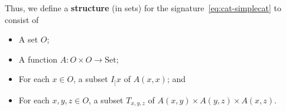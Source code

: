 \documentclass{amsart}
\begin{document}
Thus, we define a \textbf{structure} (in sets) for the signature~\eqref{eq:cat-simplecat} to consist of
\begin{itemize}
\item A set $O$;
\item A function $A:O\times O \to \mathrm{Set}$;
\item For each $x\in O$, a subset $I_[x$ of $A(x,x)$; and
\item For each $x,y,z\in O$, a subset $T_{x,y,z}$ of $A(x,y) \times A(y,z) \times A(x,z)$.
\end{itemize}
%
\end{document}
